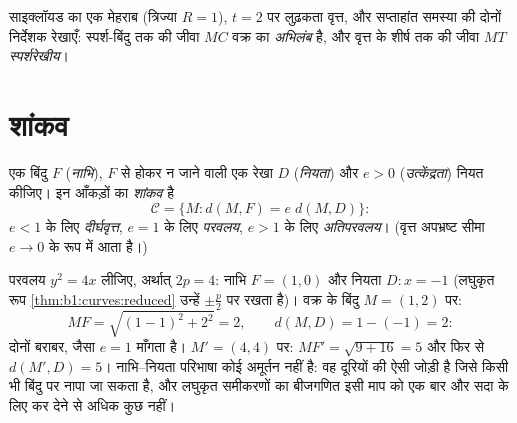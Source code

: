 \begin{omfigure}

{\small साइक्लॉयड का एक मेहराब (त्रिज्या $R = 1$), $t = 2$ पर लुढ़कता वृत्त,
और सप्ताहांत समस्या की दोनों निर्देशक रेखाएँ: स्पर्श-बिंदु तक की जीवा $MC$
वक्र का \emph{अभिलंब} है, और वृत्त के शीर्ष तक की जीवा $MT$
\emph{स्पर्शरेखीय}।}
\end{omfigure}

\section{शांकव}

\begin{definition}[नाभि--नियता परिभाषा]\label{def:b1:curves:conics}
एक बिंदु $F$ (\emph{नाभि}), $F$ से होकर न जाने वाली एक रेखा $D$
(\emph{नियता}) और $e > 0$ (\emph{उत्केंद्रता}) नियत कीजिए। इन आँकड़ों का
\emph{शांकव} है
\[
\mathcal{C} = \{M : d(M, F) = e\; d(M, D)\}:
\]
$e < 1$ के लिए \emph{दीर्घवृत्त}, $e = 1$ के लिए \emph{परवलय}, $e > 1$ के
लिए \emph{अतिपरवलय}। (वृत्त अपभ्रष्ट सीमा $e \to 0$ के रूप में आता है।)
\end{definition}

\begin{example}[परिभाषा, किसी परवलय पर जाँची हुई]
\label{ex:b1:curves:parabolacheck}
परवलय $y^2 = 4x$ लीजिए, अर्थात् $2p = 4$: नाभि $F = (1, 0)$ और नियता $D : x
= -1$ (लघुकृत रूप \cref{thm:b1:curves:reduced} उन्हें $\pm\frac p2$ पर रखता
है)। वक्र के बिंदु $M = (1, 2)$ पर:
\[
MF = \sqrt{(1-1)^2 + 2^2} = 2,
\qquad
d(M, D) = 1 - (-1) = 2 :
\]
दोनों बराबर, जैसा $e = 1$ माँगता है। $M' = (4, 4)$ पर: $MF' = \sqrt{9 + 16}
= 5$ और फिर से $d(M', D) = 5$। नाभि--नियता परिभाषा कोई अमूर्तन नहीं है: वह
दूरियों की ऐसी जोड़ी है जिसे किसी भी बिंदु पर नापा जा सकता है, और लघुकृत
समीकरणों का बीजगणित इसी माप को एक बार और सदा के लिए कर देने से अधिक कुछ
नहीं।
\end{example}

